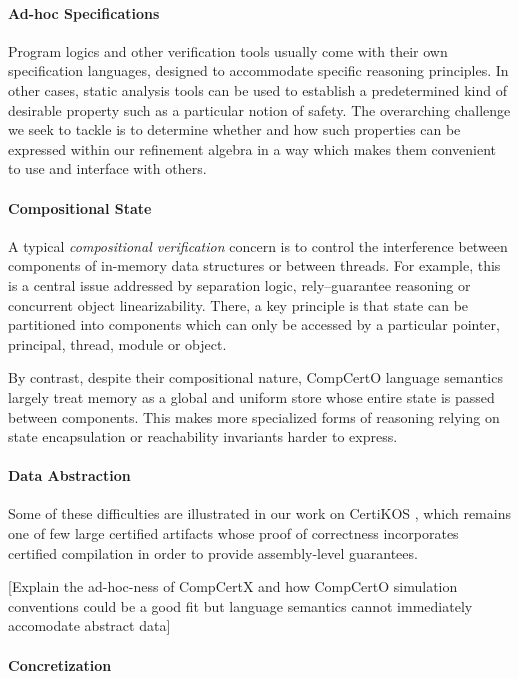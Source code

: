 \paragraph{Ad-hoc Specifications}

Program logics and other verification tools
usually come with their own specification languages,
designed to accommodate specific reasoning principles.
In other cases,
static analysis tools
can be used to establish a predetermined kind of desirable property
such as a particular notion of safety.
%
The overarching challenge we seek to tackle
is to determine whether and how such properties
can be expressed within our refinement algebra
in a way which makes them convenient to use and interface
with others.

\paragraph{Compositional State}

A typical \emph{compositional verification} concern is to
control the interference between
components of in-memory data structures
or between threads.
For example,
this is a central issue addressed by
separation logic,
rely--guarantee reasoning or
concurrent object linearizability.
There,
a key principle is that
state can be partitioned into components
which can only be accessed by a particular
pointer, principal, thread, module or object.

By contrast,
despite their compositional nature,
CompCertO language semantics
largely treat memory as a global and uniform store
whose entire state is passed between components.
This makes more specialized forms of reasoning
relying on state encapsulation or reachability invariants
harder to express.

\paragraph{Data Abstraction}

Some of these difficulties are illustrated
in our work on CertiKOS \cite{dscal15},
which remains one of few large certified artifacts
whose proof of correctness incorporates certified compilation
in order to provide assembly-level guarantees.

[Explain the ad-hoc-ness of CompCertX and how
CompCertO simulation conventions could be a good fit but
language semantics cannot immediately accomodate abstract data]

\paragraph{Concretization}

